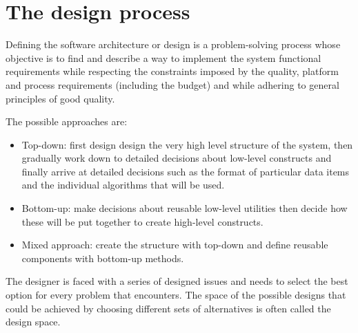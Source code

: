 \documentclass[12pt, a4paper]{report}
\newtheorem[style=M,bodystyle=\normalfont]{theorem}{Theorem}
\newtheorem[style=M,bodystyle=\normalfont]{corollary}{Corollary}
\newtheorem[style=M,bodystyle=\normalfont]{lemma}{Lemma}
\newtheorem[style=M,bodystyle=\normalfont]{definition}{Definition}
\begin{document}
\section{The design process}
    \begin{definition}
        Defining the software architecture or design is a problem-solving process whose objective is to find and describe a way to implement the system functional requirements while respecting the constraints imposed by the quality, platform and process requirements (including the budget) and while adhering to general principles of good quality.
    \end{definition}
    The possible approaches are: 
    \begin{itemize}
        \item Top-down: first design design the very high level structure of the system, then gradually work down to detailed decisions about low-level constructs and finally arrive at detailed decisions such as the format of particular data items and the individual algorithms that will be used.
        \item Bottom-up: make decisions about reusable low-level utilities then decide how these will be put together to create high-level constructs.
        \item Mixed approach: create the structure with top-down and define reusable components with bottom-up methods.
    \end{itemize}
    The designer is faced with a series of designed issues and needs to select the best option for every problem that encounters. The space of the possible designs that could be achieved by choosing different sets of alternatives is often called the design space. 
    










    

    
\end{document}
